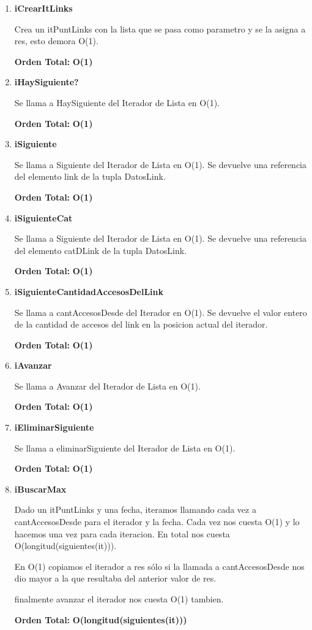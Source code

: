 \vspace*{1em}
\begin{enumerate}

\item\textbf{iCrearItLinks}
\par Crea un itPuntLinks con la lista que se pasa como parametro y se la asigna a res, esto demora O(1).
\par \textbf{Orden Total:} \textbf{O(1)}

\item\textbf{iHaySiguiente?}
\par Se llama a HaySiguiente del Iterador de Lista en O(1).
\par \textbf{Orden Total:} \textbf{O(1)}

\item\textbf{iSiguiente}
\par Se llama a Siguiente del Iterador de Lista en O(1). Se devuelve una referencia del elemento link de la tupla DatosLink.
\par \textbf{Orden Total:} \textbf{O(1)}

\item\textbf{iSiguienteCat}
\par Se llama a Siguiente del Iterador de Lista en O(1). Se devuelve una referencia del elemento catDLink de la tupla DatosLink.
\par \textbf{Orden Total:} \textbf{O(1)}

\item\textbf{iSiguienteCantidadAccesosDelLink}
\par Se llama a cantAccesosDesde del Iterador en O(1). Se devuelve el valor entero de la cantidad de accesos del link en la posicion actual del iterador.
\par \textbf{Orden Total:} \textbf{O(1)}

\item\textbf{iAvanzar}
\par Se llama a Avanzar del Iterador de Lista en O(1).
\par \textbf{Orden Total:} \textbf{O(1)}

\item\textbf{iEliminarSiguiente}
\par Se llama a eliminarSiguiente del Iterador de Lista en O(1).
\par \textbf{Orden Total:} \textbf{O(1)}

\item\textbf{iBuscarMax}
\par Dado un itPuntLinks y una fecha, iteramos llamando cada vez a cantAccesosDesde para el iterador y la fecha. Cada vez nos cuesta O(1) y lo hacemos una vez para cada iteracion. En total nos cuesta O(longitud(siguientes(it))).
\par En O(1) copiamos el iterador a res sólo si la llamada a cantAccesosDesde nos dio mayor a la que resultaba del anterior valor de res.
\par finalmente avanzar el iterador nos cuesta O(1) tambien.
\par \textbf{Orden Total:} \textbf{O(longitud(siguientes(it)))}


\end{enumerate}
